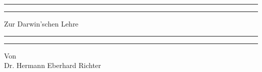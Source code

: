 \documentclass[a4paper, 11pt, oneside, english]{article}
\begin{document}
\renewcommand\thefootnote{{\bfseries\color{Cerulean}{\arabic{footnote}}}}
\let\oldfootnote\footnote
    \renewcommand{\footnote}[1]{\oldfootnote{{\normalsize\bfseries\color{Cerulean}#1}}}
\begin{titlepage} %
	\centering %
	\scshape %

	
	\rule{\textwidth}{1.6pt}\vspace*{-\baselineskip}\vspace*{2pt} %
	\rule{\textwidth}{0.4pt} %
	
	\vspace{0.75\baselineskip} %

        {\Huge Zur Darwin'schen Lehre \\} %
	
	\vspace{0.75\baselineskip} %
	
	\rule{\textwidth}{0.4pt}\vspace*{-\baselineskip}\vspace{3.2pt} %
	\rule{\textwidth}{1.6pt} %
	
	\vspace{1\baselineskip} %
	
	
	{Von \\\Large Dr. Hermann Eberhard Richter\\} %
	
	\vspace*{1\baselineskip} %
	
	
		
		

\end{titlepage}
\end{document}
